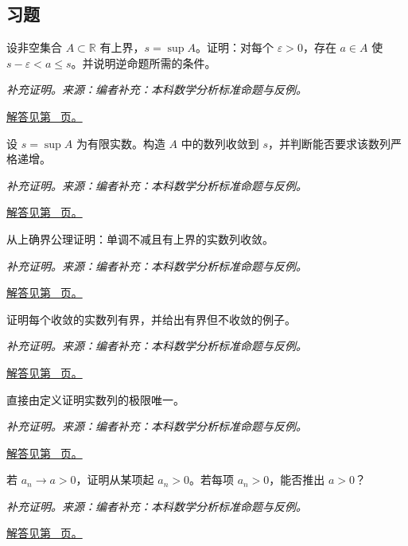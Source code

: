 \documentclass[UTF8,12pt,a4paper,fontset=fandol]{ctexart}
\begin{document}
\subsection{习题}
\begin{example}[上确界的逼近性质]\label{ex:c2q1}
设非空集合 $A\subset\mathbb R$ 有上界，$s=\sup A$。证明：对每个 $\varepsilon>0$，存在 $a\in A$ 使 $s-\varepsilon<a\le s$。并说明逆命题所需的条件。
\par\textit{补充证明。来源：编者补充：本科数学分析标准命题与反例。}\par\hyperref[ans:c2q1]{解答见第~\pageref{ans:c2q1} 页。}
\end{example}
\begin{example}[从上确界构造逼近数列]\label{ex:c2q2}
设 $s=\sup A$ 为有限实数。构造 $A$ 中的数列收敛到 $s$，并判断能否要求该数列严格递增。
\par\textit{补充证明。来源：编者补充：本科数学分析标准命题与反例。}\par\hyperref[ans:c2q2]{解答见第~\pageref{ans:c2q2} 页。}
\end{example}
\begin{example}[单调有界定理的证明]\label{ex:c2q3}
从上确界公理证明：单调不减且有上界的实数列收敛。
\par\textit{补充证明。来源：编者补充：本科数学分析标准命题与反例。}\par\hyperref[ans:c2q3]{解答见第~\pageref{ans:c2q3} 页。}
\end{example}
\begin{example}[收敛数列有界]\label{ex:c2q4}
证明每个收敛的实数列有界，并给出有界但不收敛的例子。
\par\textit{补充证明。来源：编者补充：本科数学分析标准命题与反例。}\par\hyperref[ans:c2q4]{解答见第~\pageref{ans:c2q4} 页。}
\end{example}
\begin{example}[极限的唯一性]\label{ex:c2q5}
直接由定义证明实数列的极限唯一。
\par\textit{补充证明。来源：编者补充：本科数学分析标准命题与反例。}\par\hyperref[ans:c2q5]{解答见第~\pageref{ans:c2q5} 页。}
\end{example}
\begin{example}[保号性与严格不等式]\label{ex:c2q6}
若 $a_n\to a>0$，证明从某项起 $a_n>0$。若每项 $a_n>0$，能否推出 $a>0$？
\par\textit{补充证明。来源：编者补充：本科数学分析标准命题与反例。}\par\hyperref[ans:c2q6]{解答见第~\pageref{ans:c2q6} 页。}
\end{example}
\end{document}
